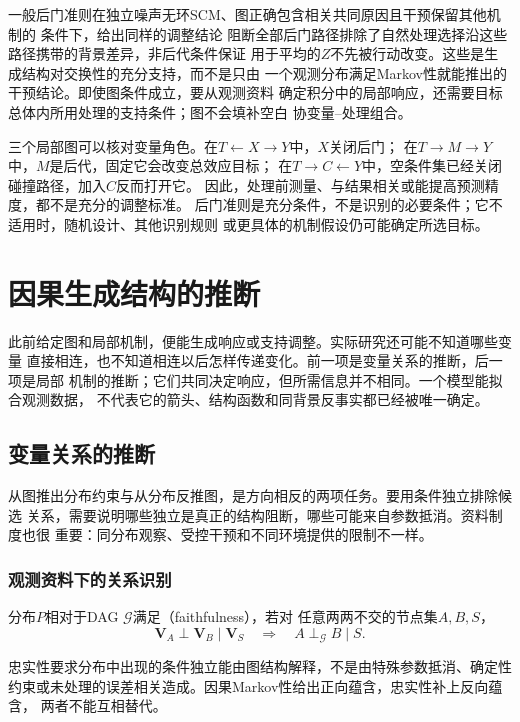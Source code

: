 一般后门准则在独立噪声无环SCM、图正确包含相关共同原因且干预保留其他机制的
条件下，给出同样的调整结论
阻断全部后门路径排除了自然处理选择沿这些路径携带的背景差异，非后代条件保证
用于平均的\(Z\)不先被行动改变。这些是生成结构对交换性的充分支持，而不是只由
一个观测分布满足Markov性就能推出的干预结论。即使图条件成立，要从观测资料
确定积分中的局部响应，还需要目标总体内所用处理的支持条件；图不会填补空白
协变量--处理组合。

三个局部图可以核对变量角色。在\(T\leftarrow X\to Y\)中，\(X\)关闭后门；
在\(T\to M\to Y\)中，\(M\)是后代，固定它会改变总效应目标；
在\(T\to C\leftarrow Y\)中，空条件集已经关闭碰撞路径，加入\(C\)反而打开它。
因此，处理前测量、与结果相关或能提高预测精度，都不是充分的调整标准。
后门准则是充分条件，不是识别的必要条件；它不适用时，随机设计、其他识别规则
或更具体的机制假设仍可能确定所选目标。

\section{因果生成结构的推断}
\label{sec:causal-structure-discovery}

此前给定图和局部机制，便能生成响应或支持调整。实际研究还可能不知道哪些变量
直接相连，也不知道相连以后怎样传递变化。前一项是变量关系的推断，后一项是局部
机制的推断；它们共同决定响应，但所需信息并不相同。一个模型能拟合观测数据，
不代表它的箭头、结构函数和同背景反事实都已经被唯一确定。

\subsection{变量关系的推断}
\label{sec:causal-relation-inference}

从图推出分布约束与从分布反推图，是方向相反的两项任务。要用条件独立排除候选
关系，需要说明哪些独立是真正的结构阻断，哪些可能来自参数抵消。资料制度也很
重要：同分布观察、受控干预和不同环境提供的限制不一样。

\subsubsection{观测资料下的关系识别}
\label{sec:causal-observational-structure}

\begin{definition}[相对于DAG的忠实性]
  \label{def:causal-faithfulness}
  分布\(P\)相对于DAG \(\mathcal G\)满足（faithfulness），若对
  任意两两不交的节点集\(A,B,S\)，
  \[
    \bm V_A\perp\bm V_B\mid\bm V_S
    \quad\Longrightarrow\quad
    A\perp_{\mathcal G}B\mid S.
  \]
\end{definition}
忠实性要求分布中出现的条件独立能由图结构解释，不是由特殊参数抵消、确定性
约束或未处理的误差相关造成。因果Markov性给出正向蕴含，忠实性补上反向蕴含，
两者不能互相替代。

